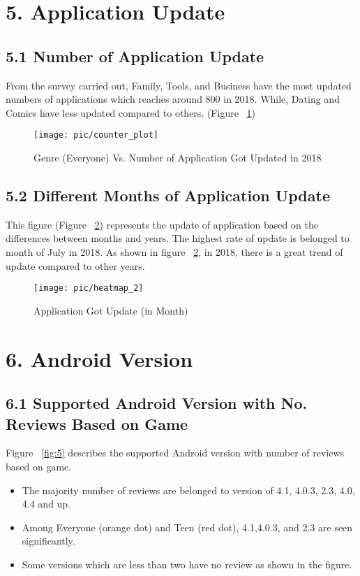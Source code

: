 \documentclass{article}
\begin{document}
\section*{5. Application Update}
\subsection*{5.1 Number of Application Update}
From the survey carried out, Family, Tools, and Business have the most updated numbers of applications which reaches around 800 in 2018. While, Dating and Comics have less updated compared to others. (Figure ~\ref{fig:3})  
\begin{figure}
\centering
\texttt{[image: pic/counter\_plot]}
\caption{Genre (Everyone) Vs. Number of Application Got Updated in 2018 }
\label{fig:3}
\end{figure}

\subsection*{5.2 Different Months of Application Update}
This figure (Figure ~\ref{fig:4}) represents the update of application based on the differences between months and years. The highest rate of update is belonged to month of July in 2018. As shown in figure ~\ref{fig:4}, in 2018, there is a great trend of update compared to other years.
\begin{figure}
\centering
\texttt{[image: pic/heatmap\_2]}
\caption{Application Got Update (in Month)}
\label{fig:4}
\end{figure}

\section*{6. Android Version}
\subsection*{6.1 Supported Android Version with No. Reviews Based on Game}
Figure ~\ref{fig:5} describes the supported Android version with number of reviews based on game.
\begin{itemize}
\item The majority number of reviews are belonged to version of 4.1, 4.0.3, 2.3, 4.0, 4.4 and up.\\
\item Among Everyone (orange dot) and Teen (red dot), 4.1,4.0.3, and 2.3 are seen significantly.\\
\item Some versions which are less than two have no review as shown in the figure.\\
\end{itemize}
\end{document}

